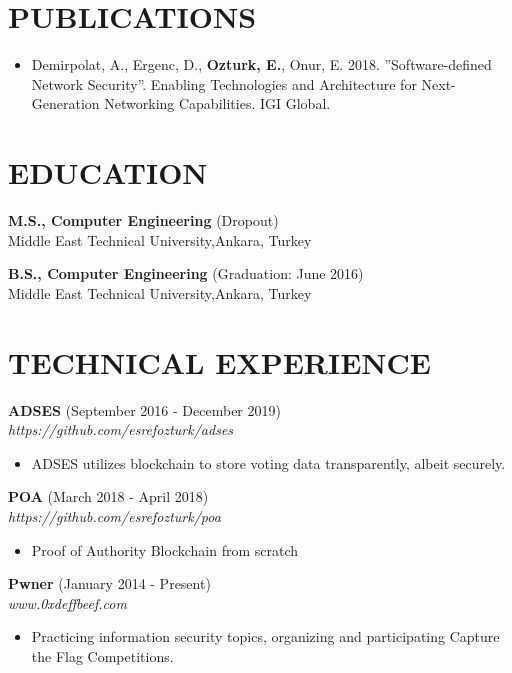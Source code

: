 \documentclass[margin, 10pt]{res} %
\begin{document}
\begin{resume}
        \section{PUBLICATIONS}
        \begin{itemize}
        		\item  Demirpolat, A., Ergenc, D., {\bf Ozturk, E.}, Onur, E. 2018. ”Software-defined Network Security”. Enabling Technologies and Architecture for Next-Generation Networking Capabilities. IGI Global.

        \end{itemize}
        


        \section{EDUCATION}

        {\bf M.S., Computer Engineering } \hfill {(Dropout)}\\
        Middle East Technical University,Ankara, Turkey

        {\bf B.S., Computer Engineering } \hfill {(Graduation: June 2016)}\\
        Middle East Technical University,Ankara, Turkey


        \section{TECHNICAL EXPERIENCE}

        {\bf ADSES} \hfill (September 2016 - December 2019) \\
        \textit{https://github.com/esrefozturk/adses}
        \begin{itemize}
            \item ADSES utilizes blockchain to store voting data transparently, albeit securely.
        \end{itemize}

        {\bf POA} \hfill (March 2018 - April 2018) \\
        \textit{https://github.com/esrefozturk/poa}
        \begin{itemize}
            \item Proof of Authority Blockchain from scratch
        \end{itemize}

        {\bf Pwner} \hfill (January 2014 - Present) \\
        \textit{www.0xdeffbeef.com}
        \begin{itemize}
            \item Practicing information security topics, organizing and participating Capture the Flag Competitions.
        \end{itemize}


\end{resume}
\end{document}
